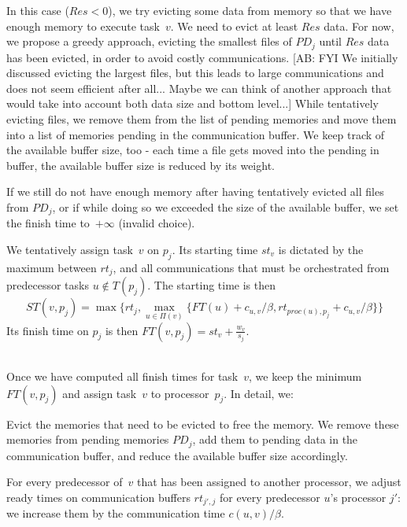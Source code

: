 \documentclass[sigconf,review,anonymous]{acmart}
\newcommand{\PD}{PD}
\newcommand{\AB}[1]{{\color{purple}[AB: #1]}}
\begin{document}
In this case ($Res <0$), we  try evicting
some data from memory so that we have enough memory to execute task~$v$. 
We need to evict at least $Res$ data.
For now, we propose a greedy approach, evicting the smallest files of $\PD_j$ until $Res$ data has been evicted,
in order to avoid costly communications. 
\AB{FYI We initially discussed  evicting the largest files, but this leads to 
large communications and does not seem efficient after all... Maybe we can think of another 
approach that would take into account both data size and bottom level...}
While tentatively evicting files, we remove them from the list of pending memories and move them into a list
    of memories pending in the communication buffer.
We keep track of the available buffer size, too - each time a file gets moved into the pending in buffer, the available buffer size is reduced by its weight.

If we still do not have enough memory after having tentatively evicted all files from $\PD_j$,
    or if while doing so we exceeded the size of the available buffer,
we set the finish time to~$+\infty$ (invalid choice). 

\smallskip
{} We tentatively assign task~$v$ on $p_j$.
    Its starting time $st_v$
is dictated by the maximum between $rt_j$, and all communications that
must be orchestrated from predecessor tasks $u\notin T(p_j)$.
    The starting time is then
    \[ST(v, p_j) = \max{ \{rt_j, \max_{ u \in \Pi(v)}\{ FT(u)+ c_{u,v} / \beta , rt_{proc(u), p_j} + c_{u,v} / \beta  \} \} } \]
    Its finish time on $p_j$ is then
$FT(v,p_j) = st_v + \frac{w_v}{s_j}$.



\medskip
{}\\
Once we have computed all finish times for task~$v$, 
we keep the minimum $FT(v,p_j)$ and assign task~$v$
to processor~$p_j$.
In detail, we:

    \textbullet
    Evict the memories that need to be evicted to free the memory. We remove these memories from pending memories
        $PD_j$, add them to pending data in the communication buffer, and reduce the available buffer size accordingly.

    \textbullet For every predecessor of~$v$ that has been assigned to another processor, we adjust ready times on
    communication buffers $rt_{j', j}$ for every predecessor $u$'s processor $j'$: we increase them by the
    communication time $c( u,v) / \beta$.
\end{document}
